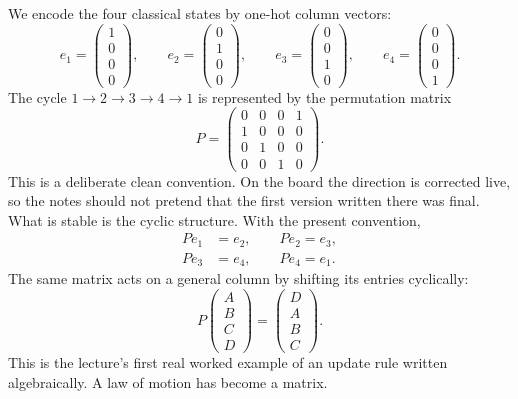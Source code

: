We encode the four classical states by one-hot column vectors:
\begin{equation}
e_1=
\begin{pmatrix}
1\\0\\0\\0
\end{pmatrix},
\qquad
e_2=
\begin{pmatrix}
0\\1\\0\\0
\end{pmatrix},
\qquad
e_3=
\begin{pmatrix}
0\\0\\1\\0
\end{pmatrix},
\qquad
e_4=
\begin{pmatrix}
0\\0\\0\\1
\end{pmatrix}.
\end{equation}
The cycle \(1\to2\to3\to4\to1\) is represented by the permutation matrix
\begin{equation}
P=
\begin{pmatrix}
0&0&0&1\\
1&0&0&0\\
0&1&0&0\\
0&0&1&0
\end{pmatrix}.
\end{equation}
This is a deliberate clean convention. On the board the direction is corrected live, so the notes should not pretend that the first version written there was final. What is stable is the cyclic structure. With the present convention,
\begin{equation}
\begin{aligned}
Pe_1&=e_2,\qquad Pe_2=e_3,\\
Pe_3&=e_4,\qquad Pe_4=e_1.
\end{aligned}
\end{equation}
The same matrix acts on a general column by shifting its entries cyclically:
\begin{equation}
P
\begin{pmatrix}
A\\
B\\
C\\
D
\end{pmatrix}
=
\begin{pmatrix}
D\\
A\\
B\\
C
\end{pmatrix}.
\end{equation}
This is the lecture's first real worked example of an update rule written algebraically. A law of motion has become a matrix.

